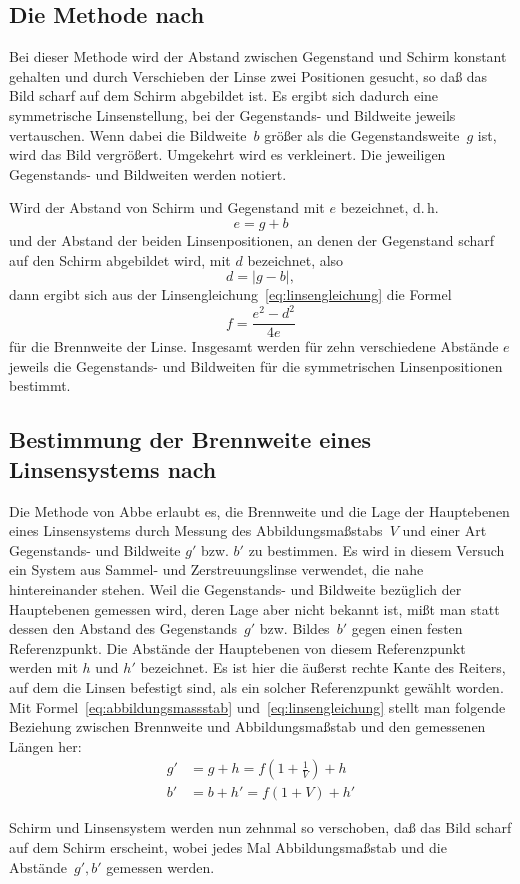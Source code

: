 \subsection{Die Methode nach }

Bei dieser Methode wird der Abstand zwischen Gegenstand und Schirm
konstant gehalten und durch Verschieben der Linse zwei Positionen
gesucht, so daß das Bild scharf auf dem Schirm abgebildet ist. Es ergibt
sich dadurch eine symmetrische Linsenstellung, bei der Gegenstands- und
Bildweite jeweils vertauschen. Wenn dabei die Bildweite~$b$ größer als
die Gegenstandsweite~$g$ ist, wird das Bild vergrößert. Umgekehrt wird
es verkleinert. Die jeweiligen Gegenstands- und Bildweiten werden
notiert.

Wird der Abstand von Schirm und Gegenstand mit $e$ bezeichnet, d.\,h.
%
\begin{equation}
  e = g + b
\end{equation} 
%
und der Abstand der beiden Linsenpositionen, an denen der Gegenstand
scharf auf den Schirm abgebildet wird, mit $d$ bezeichnet, also
%
\begin{equation}
  d = |g - b|,
\end{equation}
%
dann ergibt sich aus der Linsengleichung~\eqref{eq:linsengleichung} die
Formel
%
\begin{equation} f = \frac{e^2 - d^2}{4e}
  \label{eq:f-bessel}
\end{equation}
%
für die Brennweite der Linse. Insgesamt werden für zehn verschiedene
Abstände $e$ jeweils die Gegenstands- und Bildweiten für die
symmetrischen Linsenpositionen bestimmt.

\subsection{Bestimmung der Brennweite eines Linsensystems nach
}

Die Methode von Abbe erlaubt es, die Brennweite und die Lage der
Hauptebenen eines Linsensystems durch Messung des Abbildungsmaßstabs~$V$
und einer Art Gegenstands- und Bildweite $g'$ bzw. $b'$ zu bestimmen. Es
wird in diesem Versuch ein System aus Sammel- und Zerstreuungslinse
verwendet, die nahe hintereinander stehen. Weil die Gegenstands- und
Bildweite bezüglich der Hauptebenen gemessen wird, deren Lage aber nicht
bekannt ist, mißt man statt dessen den Abstand des Gegenstands~$g'$
bzw. Bildes~$b'$ gegen einen festen Referenzpunkt. Die Abstände der
Hauptebenen von diesem Referenzpunkt werden mit $h$ und $h'$
bezeichnet. Es ist hier die äußerst rechte Kante des Reiters, auf dem
die Linsen befestigt sind, als ein solcher Referenzpunkt gewählt
worden. Mit Formel~\eqref{eq:abbildungsmassstab}
und~\eqref{eq:linsengleichung} stellt man folgende Beziehung zwischen
Brennweite und Abbildungsmaßstab und den gemessenen Längen her:
%
\begin{align}
  \label{eq:abbe-gegenstand}
  g' &= g + h  = f \left(1 + \frac{1}{V}\right) + h\\
  \label{eq:abbe-bild}
  b' &= b + h' = f (1 + V) + h'
\end{align}

Schirm und Linsensystem werden nun zehnmal so verschoben, daß das Bild
scharf auf dem Schirm erscheint, wobei jedes Mal Abbildungsmaßstab und
die Abstände~$g', b'$ gemessen werden.
